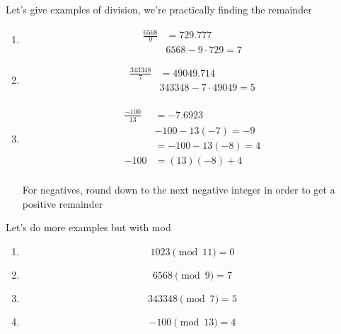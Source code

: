 \documentclass[../../Main.tex]{subfiles}
\begin{document}
\begin{example}
    Let's give examples of division, we're practically finding the remainder

    \begin{enumerate}
        \item
        {
            \begin{align*}
                \frac{6568}{9} &= 729.777 \\
                & 6568 - 9 \cdot 729 = 7
            \end{align*}
        }
        
        \item
        {
            \begin{align*}
                \frac{343348}{7} &= 49049.714 \\
                & 343348 - 7 \cdot 49049 = 5 \\
            \end{align*}
        }

        \item
        {
            \begin{align*}
                \frac{-100}{13} &= -7.6923 \\
                & -100 - 13(-7) = -9 \\
                &= -100 - 13(-8) = 4 \\
                -100 &= (13)(-8) + 4 \\
            \end{align*}
        }

        \begin{note}
            For negatives, round down to the next negative integer in order to get a positive remainder
        \end{note}
    \end{enumerate}
\end{example}

\begin{example}
    Let's do more examples but with mod

    \begin{enumerate}
        \item $$1023 \pmod{11} = 0$$
        \item $$6568 \pmod{9} = 7$$
        \item $$343348 \pmod{7} = 5$$
        \item $$-100 \pmod{13} = 4$$
    \end{enumerate}
\end{example}
\end{document}
